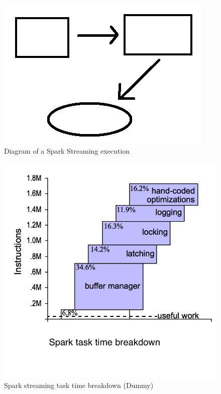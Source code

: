 \begin{figure}[t!]
  \begin{center}
    \includegraphics[scale=0.30]{images_graphs/spark_diagram.png}
  \end{center}
  \caption{Diagram of a Spark Streaming execution}
  \label{fig:deserialization}
\end{figure}

\begin{figure}[t!]
  \begin{center}
    \includegraphics[scale=0.30]{images_graphs/time_breakdown.png}
  \end{center}
  \caption{Spark streaming task time breakdown (Dummy)}
  \label{fig:deserialization}
\end{figure}

